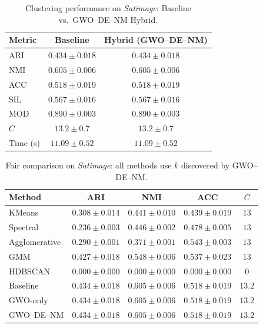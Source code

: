 \begin{table}[htbp]
\centering
\caption{Clustering performance on \textit{Satimage}: Baseline vs.\ GWO--DE--NM Hybrid.}
\label{tab:satimage}
\begin{tabular}{lcc}
\toprule
Metric & Baseline & Hybrid (GWO--DE--NM) \\
\midrule
ARI & $0.434 \pm 0.018$ & $\mathbf{0.434 \pm 0.018}$ \\
NMI & $0.605 \pm 0.006$ & $\mathbf{0.605 \pm 0.006}$ \\
ACC & $0.518 \pm 0.019$ & $\mathbf{0.518 \pm 0.019}$ \\
SIL & $0.567 \pm 0.016$ & $\mathbf{0.567 \pm 0.016}$ \\
MOD & $0.890 \pm 0.003$ & $\mathbf{0.890 \pm 0.003}$ \\
\midrule
$C$ & $13.2 \pm 0.7$ & $13.2 \pm 0.7$ \\
Time (s) & $11.09 \pm 0.52$ & $11.09 \pm 0.52$ \\
\bottomrule
\end{tabular}
\end{table}

\begin{table}[htbp]
\centering\small
\caption{Fair comparison on \textit{Satimage}: all methods use $k$ discovered by GWO--DE--NM.}
\label{tab:fair_satimage}
\begin{tabular}{lcccc}
\toprule
Method & ARI & NMI & ACC & $C$ \\
\midrule
KMeans & $0.308 \pm 0.014$ & $0.441 \pm 0.010$ & $0.439 \pm 0.019$ & $13$ \\
Spectral & $0.236 \pm 0.003$ & $0.446 \pm 0.002$ & $0.478 \pm 0.005$ & $13$ \\
Agglomerative & $0.290 \pm 0.001$ & $0.371 \pm 0.001$ & $0.543 \pm 0.003$ & $13$ \\
GMM & $0.427 \pm 0.018$ & $0.548 \pm 0.006$ & $0.537 \pm 0.023$ & $13$ \\
HDBSCAN & $0.000 \pm 0.000$ & $0.000 \pm 0.000$ & $0.000 \pm 0.000$ & $0$ \\
\midrule
Baseline & $\mathbf{0.434 \pm 0.018}$ & $0.605 \pm 0.006$ & $0.518 \pm 0.019$ & $13.2$ \\
GWO-only & $0.434 \pm 0.018$ & $0.605 \pm 0.006$ & $0.518 \pm 0.019$ & $13.2$ \\
GWO--DE--NM & $0.434 \pm 0.018$ & $0.605 \pm 0.006$ & $0.518 \pm 0.019$ & $13.2$ \\
\bottomrule
\end{tabular}
\end{table}

